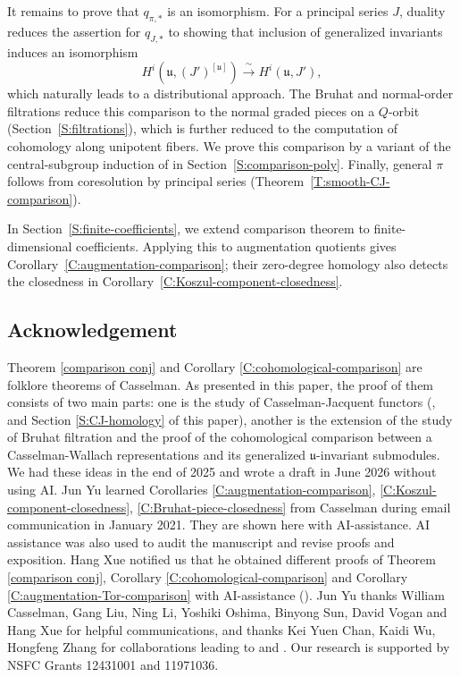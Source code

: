 \documentclass[a4paper,12pt]{amsart}
\numberwithin{equation}{section}
\theoremstyle{plain}
\theoremstyle{definition}
\theoremstyle{remark}
\begin{document}
It remains to prove that $q_{\pi,*}$ is an isomorphism. For a principal series $J$, duality reduces the assertion for $q_{J,*}$ to showing that inclusion of generalized invariants induces an isomorphism
\begin{equation}\label{Eq:intro-dual}
 H^i(\mathfrak u,(J')^{[\mathfrak u]})
 \xrightarrow{\ \sim\ } H^i(\mathfrak u,J'),
\end{equation}
which naturally leads to a distributional approach.
The Bruhat and normal-order filtrations reduce this comparison to the normal graded pieces on a $Q$-orbit (Section~\ref{S:filtrations}), which is further reduced to the computation of cohomology along unipotent fibers.
We prove this comparison by a variant of the central-subgroup induction of \cite[Section~4]{LLY} in Section~\ref{S:comparison-poly}.
Finally, general $\pi$ follows from coresolution by principal series (Theorem~\ref{T:smooth-CJ-comparison}).

In Section~\ref{S:finite-coefficients}, we extend comparison theorem to finite-dimensional coefficients.
Applying this to augmentation quotients gives Corollary~\ref{C:augmentation-comparison}; their zero-degree homology also detects the closedness in Corollary~\ref{C:Koszul-component-closedness}.


\subsection*{Acknowledgement}
Theorem \ref{comparison conj} and Corollary \ref{C:cohomological-comparison} are folklore theorems of Casselman. As presented in this paper, the proof of them consists of two main parts: one is the study of Casselman-Jacquent functors (\cite{CWYZ}, \cite{Wu-Yu} and Section \ref{S:CJ-homology} of this paper), another is the extension of the study of Bruhat filtration and the proof of the cohomological comparison between a Casselman-Wallach representations and its generalized $\mathfrak{u}$-invariant submodules. We had these ideas in the end of 2025 and wrote a draft in June 2026 without using AI. Jun Yu learned Corollaries 
\ref{C:augmentation-comparison}, \ref{C:Koszul-component-closedness}, \ref{C:Bruhat-piece-closedness} from Casselman during email communication in January 2021. They are shown here with AI-assistance. AI assistance was also used to audit the manuscript and revise proofs and exposition. Hang Xue notified us that he obtained different proofs of Theorem \ref{comparison conj}, 
Corollary \ref{C:cohomological-comparison} and 
Corollary \ref{C:augmentation-Tor-comparison} with AI-assistance (\cite{Xue}). Jun Yu thanks William Casselman, Gang Liu, Ning Li, Yoshiki Oshima, Binyong Sun, David Vogan and Hang Xue for helpful communications, and thanks Kei Yuen Chan, Kaidi Wu, Hongfeng Zhang for collaborations leading to \cite{CWYZ} and \cite{Wu-Yu}. Our research is supported by NSFC Grants 12431001 and 11971036.
\end{document}
